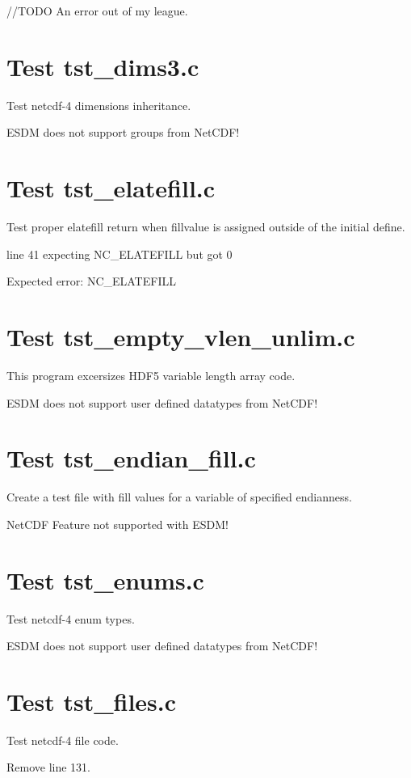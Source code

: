 //TODO An error out of my league.

\section{Test tst\_dims3.c}

Test netcdf-4 dimensions inheritance.

ESDM does not support groups from NetCDF!

\section{Test tst\_elatefill.c}

Test proper elatefill return when fillvalue is assigned outside of
the initial define.

line 41 expecting NC\_ELATEFILL but got 0

Expected error: NC\_ELATEFILL

\section{Test tst\_empty\_vlen\_unlim.c}

This program excersizes HDF5 variable length array code.

ESDM does not support user defined datatypes from NetCDF!

\section{Test tst\_endian\_fill.c}

Create a test file with fill values for a variable of specified endianness.

NetCDF Feature not supported with ESDM!

\section{Test tst\_enums.c}

Test netcdf-4 enum types.

ESDM does not support user defined datatypes from NetCDF!

\section{Test tst\_files.c}

Test netcdf-4 file code.

Remove line 131.

